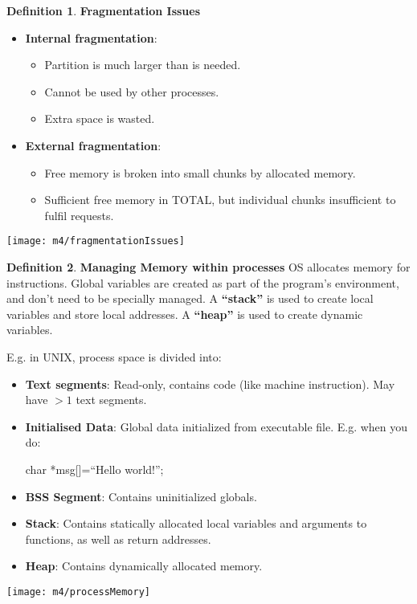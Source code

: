 \documentclass[11pt,a4paper]{article}
\theoremstyle{definition}
\newtheorem{definition}{Definition}[section]
\newenvironment{myitemize}
{ \begin{itemize}
    \setlength{\itemsep}{5pt}
    \setlength{\parskip}{0pt}
    \setlength{\parsep}{0pt}     }
{ \end{itemize}                  }
\begin{document}
\begin{definition}{\textbf{Fragmentation Issues}}
	
\begin{minipage}{0.7\linewidth}
	\begin{myitemize}
		\item \textbf{Internal fragmentation}:
		\begin{myitemize}
			\item Partition is much larger than is needed.
			\item Cannot be used by other processes.
			\item Extra space is wasted.
		\end{myitemize}
		\item \textbf{External fragmentation}:
		\begin{myitemize}
			\item Free memory is broken into small chunks by allocated memory.
			\item Sufficient free memory in TOTAL, but individual chunks insufficient to fulfil requests.
		\end{myitemize}
	\end{myitemize}
\end{minipage}
\begin{minipage}{0.3\linewidth}
	\texttt{[image: m4/fragmentationIssues]}
\end{minipage}
\end{definition}

\begin{definition}{\textbf{Managing Memory within processes}}
	OS allocates memory for instructions. Global variables are created as part of the program’s environment, and don’t need to be specially managed. A \textbf{``stack''} is used to create local variables and store local addresses. A \textbf{``heap''} is used to create dynamic variables.
	
\begin{minipage}{0.55\linewidth}
	E.g. in UNIX, process space is divided into:
	\begin{myitemize}
		\item \textbf{Text segments}: Read-only, contains code (like machine instruction). May have $>1$ text segments.
		\item \textbf{Initialised Data}: Global data initialized from executable file. E.g. when you do: 

		char *msg[]=``Hello world!'';
		\item \textbf{BSS Segment}: Contains uninitialized globals.
		\item \textbf{Stack}: Contains statically allocated local variables and arguments to functions, as well as return addresses.
		\item \textbf{Heap}: Contains dynamically allocated memory.
	\end{myitemize}
\end{minipage}
\begin{minipage}{0.45\linewidth}
	\texttt{[image: m4/processMemory]}
\end{minipage}

\end{definition}
\end{document}
